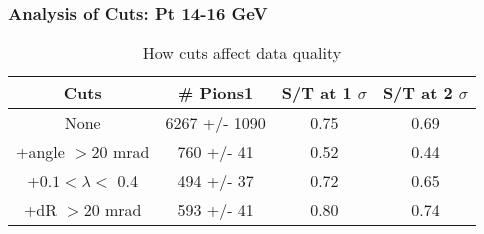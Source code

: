 \frame
{
\frametitle{Analysis of Cuts: Pt 14-16 GeV}
\begin{table}
\caption{How cuts affect data quality}
\centering
\begin{tabular}{c c c c}
\hline\hline
Cuts & \# Pions1 & S/T at 1 $\sigma$ & S/T at 2 $\sigma$ \\ [0.5ex]
\hline
None & 6267 +/- 1090 & 0.75 & 0.69 \\ %
+angle $> 20$ mrad &  760 +/-   41 & 0.52 & 0.44 \\ %
+$0.1 < \lambda <$ 0.4 &  494 +/-   37 & 0.72 & 0.65 \\ %
+dR $> 20$ mrad &  593 +/-   41 & 0.80 & 0.74 \\ %
[1ex]
\hline
\end{tabular}
\label{table:nonlin}
\end{table}
}
